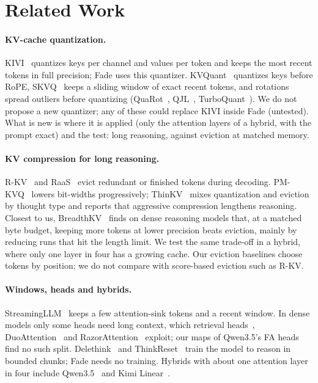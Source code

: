 \documentclass{article}
\begin{document}
\vspace{-0.6em}
\section{Related Work}
\vspace{-0.4em}
\paragraph{KV-cache quantization.} KIVI~\cite{kivi} quantizes keys per channel and values per token and keeps the most recent tokens in full precision; Fade uses this quantizer. KVQuant~\cite{kvquant} quantizes keys before RoPE, SKVQ~\cite{skvq} keeps a sliding window of exact recent tokens, and rotations spread outliers before quantizing (QuaRot~\cite{quarot}, QJL~\cite{qjl}, TurboQuant~\cite{turboquant}). We do not propose a new quantizer; any of these could replace KIVI inside Fade (untested). What is new is where it is applied (only the attention layers of a hybrid, with the prompt exact) and the test: long reasoning, against eviction at matched memory.

\paragraph{KV compression for long reasoning.} R-KV~\cite{rkv} and RaaS~\cite{raas} evict redundant or finished tokens during decoding. PM-KVQ~\cite{pmkvq} lowers bit-widths progressively; ThinKV~\cite{thinkv} mixes quantization and eviction by thought type and reports that aggressive compression lengthens reasoning. Closest to us, BreadthKV~\cite{breadthkv} finds on dense reasoning models that, at a matched byte budget, keeping more tokens at lower precision beats eviction, mainly by reducing runs that hit the length limit. We test the same trade-off in a hybrid, where only one layer in four has a growing cache. Our eviction baselines choose tokens by position; we do not compare with score-based eviction such as R-KV.

\paragraph{Windows, heads and hybrids.} StreamingLLM~\cite{streamingllm} keeps a few attention-sink tokens and a recent window. In dense models only some heads need long context, which retrieval heads~\cite{retrievalheads}, DuoAttention~\cite{duoattention} and RazorAttention~\cite{razorattention} exploit; our maps of Qwen3.5's FA heads find no such split. Delethink~\cite{delethink} and ThinkReset~\cite{thinkreset} train the model to reason in bounded chunks; Fade needs no training. Hybrids with about one attention layer in four include Qwen3.5~\cite{qwen35} and Kimi Linear~\cite{kimilinear}.
\end{document}
